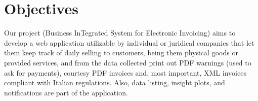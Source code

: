 \section{Objectives}


Our project (Business InTegrated System for Electronic Invoicing) aims to develop a web application utilizable by individual or juridical companies that let them keep track of daily selling to customers, being them physical goods or provided services, and from the data collected print out PDF warnings (used to ask for payments), courtesy PDF invoices and, most important, XML invoices compliant with Italian regulations. Also, data listing, insight plots, and notifications are part of the application.